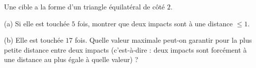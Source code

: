 Une cible a la forme d'un triangle équilatéral de côté $2$.

(a) Si elle est touchée $5$ fois, montrer que deux impacts sont à une distance $\leq 1$.

(b) Elle est touchée $17$ fois. Quelle valeur maximale peut-on garantir pour la plus petite distance entre deux impacts (c'est-à-dire : deux impacts sont forcément à une distance au plus égale à quelle valeur) ?
